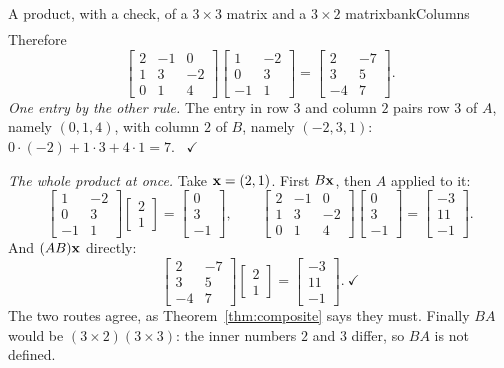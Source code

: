 \documentclass[11pt]{article}
\begin{document}
\begin{exmp}{A product, with a check, of a $3\times3$ matrix and a $3\times2$ matrix}{bankColumns}
\begin{align*}
\end{align*}
Therefore
\[
\begin{bmatrix}2&-1&0\\1&3&-2\\0&1&4\end{bmatrix}\begin{bmatrix}1&-2\\0&3\\-1&1\end{bmatrix}=\begin{bmatrix}2&-7\\3&5\\-4&7\end{bmatrix}.
\]
\emph{One entry by the other rule.} The entry in row $3$ and column $2$ pairs row $3$ of $A$, namely $(0,1,4)$, with column $2$ of $B$, namely $(-2,3,1)$: $0\cdot(-2)+1\cdot3+4\cdot1=7$. \ $\checkmark$

\emph{The whole product at once.} Take $\mathbf{x}=(2,1)$. First $B\mathbf{x}$, then $A$ applied to it:
\[
\begin{bmatrix}1&-2\\0&3\\-1&1\end{bmatrix}\begin{bmatrix}2\\1\end{bmatrix}=\begin{bmatrix}0\\3\\-1\end{bmatrix},\qquad
\begin{bmatrix}2&-1&0\\1&3&-2\\0&1&4\end{bmatrix}\begin{bmatrix}0\\3\\-1\end{bmatrix}=\begin{bmatrix}-3\\11\\-1\end{bmatrix}.
\]
And $(AB)\mathbf{x}$ directly:
\[
\begin{bmatrix}2&-7\\3&5\\-4&7\end{bmatrix}\begin{bmatrix}2\\1\end{bmatrix}=\begin{bmatrix}-3\\11\\-1\end{bmatrix}.\ \checkmark
\]
The two routes agree, as Theorem~\ref{thm:composite} says they must. Finally $BA$ would be $(3\times2)(3\times3)$: the inner numbers $2$ and $3$ differ, so $BA$ is not defined.


\end{exmp}
\end{document}
